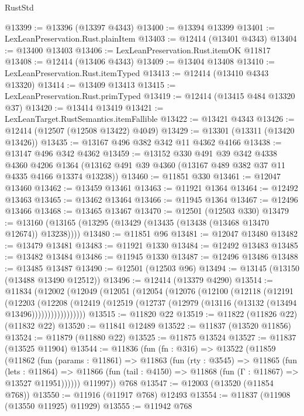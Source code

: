 \begin{lexlean}{RustStd}
\begin{coremodule}
{\begin{coremodule}
{{{{{{{{{{{{{{{{{{{{{{{{{{{{{{{{{{{{{{{{{{{{{{{{{{@13399 := @13396 (@13397 @4343)
@13400 := @13394 @13399
@13401 := LexLeanPreservation.Rust.plainItem
@13403 := @12414 (@13401 @4343)
@13404 := @13400 @13403
@13406 := LexLeanPreservation.Rust.itemOK @11817
@13408 := @12414 (@13406 @4343)
@13409 := @13404 @13408
@13410 := LexLeanPreservation.Rust.itemTyped
@13413 := @12414 (@13410 @4343 @13320)
@13414 := @13409 @13413
@13415 := LexLeanPreservation.Rust.primTyped
@13419 := @12414 (@13415 @484 @13320 @37)
@13420 := @13414 @13419
@13421 := LexLeanTarget.RustSemantics.itemFallible
@13422 := @13421 @4343
@13426 := @12414 (@12507 (@12508 @13422) @4049)
@13429 := @13301 (@13311 (@13420 @13426))
@13435 := @13167 @496 @382 @342 @11 @4362 @4166
@13438 := @13147 @496 @342 @4362
@13459 := @13152
    @330
    @491
    @39
    @342
    @4338
    @4360
    @4206
    @1364
    (@13162 @491 @39 @4360 (@13167 @489 @382 @37 @11 @4335 @4166 @13374 @13238))
@13460 := @11851 @330
@13461 := @12047 @13460
@13462 := @13459 @13461
@13463 := @11921 @1364
@13464 := @12492 @13463
@13465 := @13462 @13464
@13466 := @11945 @1364
@13467 := @12496 @13466
@13468 := @13465 @13467
@13470 := @12501 (@12503 @330)
@13479 := @13160 (@13165 (@13295 (@13429 (@13435 (@13438 (@13468 @13470 @12674)) @13238))))
@13480 := @11851 @96
@13481 := @12047 @13480
@13482 := @13479 @13481
@13483 := @11921 @1330
@13484 := @12492 @13483
@13485 := @13482 @13484
@13486 := @11945 @1330
@13487 := @12496 @13486
@13488 := @13485 @13487
@13490 := @12501 (@12503 @96)
@13494 := @13145 (@13150 (@13488 @13490 @12512))
@13496 := @12414 (@13379 @4290)
@13514 := @11834
    (@12002
      (@12049
        (@12051
          (@12054
            (@12076
              (@12100
                (@12118
                  (@12191
                    (@12203
                      (@12208
                        (@12419
                          (@12519 (@12737 (@12979 (@13116 (@13132 (@13494 @13496)))))))))))))))))
@13515 := @11820 @22
@13519 := @11822 (@11826 @22) (@11832 @22)
@13520 := @11841 @12489
@13522 := @11837 (@13520 @11856)
@13524 := @11879 (@11880 @22)
@13525 := @11875 @13524
@13527 := @11837 (@13525 @11904)
@13544 := @11836
    (fun (fn : @316) =>
    @13522
      (@11859
        (@11862
          (fun (params : @11861) =>
          @11863
            (fun (rty : @3545) =>
            @11865
              (fun (lets : @11864) =>
              @11866 (fun (tail : @4150) => @11868 (fun (Γ : @11867) => @13527 @11951))))))
        @11997))
    @768
@13547 := @12003 (@13520 (@11854 @768))
@13550 := @11916 (@11917 @768) @12493
@13554 := @11837 (@11908 (@13550 @11925) @11929)
@13555 := @11942 @768
}}}}}}}}}}}}}}}}}}}}}}}}}}}}}}}}}}}}}}}}}}}}}}}}}}
\end{coremodule}}
\end{coremodule}
\end{lexlean}
